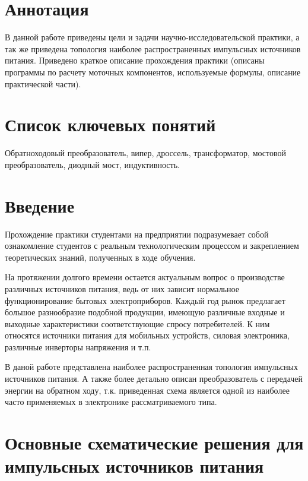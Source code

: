 


\setcounter{page}{3}

\section*{Аннотация}

	В данной работе приведены цели и задачи научно-исследовательской практики, а так же приведена топология наиболее распространенных импульсных источников питания. Приведено краткое описание прохождения практики (описаны программы по расчету моточных компонентов, используемые формулы, описание практической части).

\section*{Список ключевых понятий}

Обратноходовый преобразователь, випер, дроссель, трансформатор, мостовой преобразователь, диодный мост, индуктивность.

\newpage

\tableofcontents
\newpage

\section*{Введение}

	Прохождение практики студентами на предприятии подразумевает собой ознакомление студентов с реальным технологическим процессом и закреплением теоретических знаний, полученных в ходе обучения.
	
	На протяжении долгого времени остается актуальным вопрос о производстве различных источников питания, ведь от них зависит нормальное функционирование бытовых электроприборов. Каждый год рынок предлагает большое разнообразие подобной продукции, имеющую различные входные и выходные характеристики соответствующие спросу потребителей. К ним относятся источники питания для мобильных устройств, силовая электроника, различные инверторы напряжения и т.п.
	
	В даной работе представлена наиболее распространенная топология импульсных источников питания. А также более детально описан преобразователь с передачей энергии на обратном ходу, т.к. приведенная схема является одной из наиболее часто применяемых в электронике рассматриваемого типа.
\newpage

\section{Основные схематические решения для импульсных источников питания}

